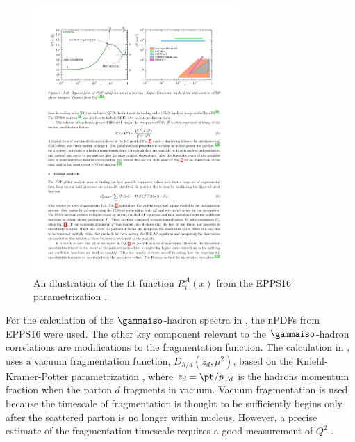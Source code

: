 {\begin{figure}[htpb]
  \centering
  \includegraphics[width=0.7\textwidth]{Introduction/cnm_cartoon}
  \caption{An illustration of the fit function $R_{i}^{A}(x)$ from the EPPS16 parametrization \cite{epps16:2017}.}
  \label{fig:cnm_cartoon_2}
\end{figure}

For the calculation of the $\gammaiso$-hadron spectra in \cite{Xie2021}, the nPDFs from EPPS16 were used. The other key component relevant to the $\gammaiso$-hadron correlations are modifications to the fragmentation function. The calculation in \cite{Xie2021}, uses a vacuum fragmentation function, $D_{h / d}\left(z_{d}, \mu^{2}\right)$, based on the Kniehl-Kramer-Potter parametrization \cite{Kniehl2000}, where $z_d=\pt/p_{\mathrm{T}d}$ is the hadrons momentum fraction when the parton $d$ fragments in vacuum. Vacuum fragmentation is used because the timescale of fragmentation is thought to be sufficiently begins only after the scattered parton is no longer within nucleus. However, a precise estimate of the fragmentation timescale requires a good measurement of $Q^2$ \cite{Sasabe1980}.



}

